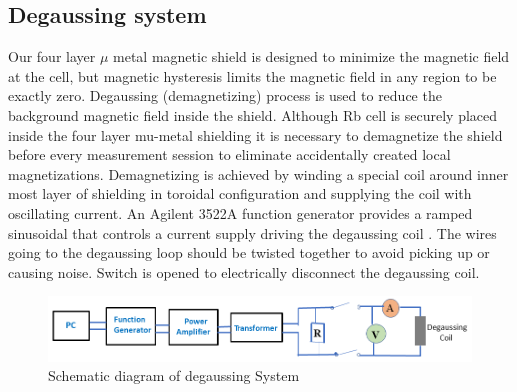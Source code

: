 \subsection{Degaussing system\label{sec:Degaussing}}
Our four layer $\mu$ metal magnetic shield is designed to minimize the magnetic field at the cell, but
magnetic hysteresis limits the magnetic field in any region to be exactly zero. Degaussing (demagnetizing) process is used to reduce the background magnetic field inside the shield. Although Rb cell is securely placed inside the four layer mu-metal shielding it is necessary to demagnetize the shield before every measurement session  to eliminate accidentally created local magnetizations.
Demagnetizing is achieved by winding a special coil around inner most layer of shielding  in toroidal configuration
and supplying the coil with oscillating current. An Agilent 3522A function generator  provides a ramped sinusoidal that controls a current supply driving the degaussing coil \cite{Martin:2014foa}. The wires going to the degaussing loop should be twisted together to avoid picking up or causing noise. Switch is opened to electrically disconnect the degaussing coil.
 
\begin{figure}[h]
\centering
\includegraphics[width=1.0\linewidth]{figures/degaussing_system}
\caption{Schematic diagram of degaussing System}
\end{figure}

